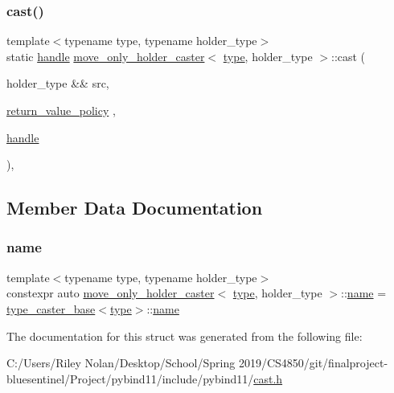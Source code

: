 \subsubsection{\texorpdfstring{cast()}{cast()}}
{\footnotesize\ttfamily template$<$typename type, typename holder\+\_\+type$>$ \\
static \mbox{\hyperlink{classhandle}{handle}} \mbox{\hyperlink{structmove__only__holder__caster}{move\+\_\+only\+\_\+holder\+\_\+caster}}$<$ \mbox{\hyperlink{_s_d_l__opengl_8h_ad5ddf6fca7b585646515660e810e0188}{type}}, holder\+\_\+type $>$\+::cast (\begin{DoxyParamCaption}\item[{holder\+\_\+type \&\&}]{src,  }\item[{\mbox{\hyperlink{detail_2common_8h_adde72ab1fb0dd4b48a5232c349a53841}{return\+\_\+value\+\_\+policy}}}]{,  }\item[{\mbox{\hyperlink{classhandle}{handle}}}]{ }\end{DoxyParamCaption})\hspace{0.3cm}{\ttfamily [inline]}, {\ttfamily [static]}}



\subsection{Member Data Documentation}
\mbox{\label{structmove__only__holder__caster_a6286ce9a51576874db390d75fde982d1}} 
\subsubsection{\texorpdfstring{name}{name}}
{\footnotesize\ttfamily template$<$typename type, typename holder\+\_\+type$>$ \\
constexpr auto \mbox{\hyperlink{structmove__only__holder__caster}{move\+\_\+only\+\_\+holder\+\_\+caster}}$<$ \mbox{\hyperlink{_s_d_l__opengl_8h_ad5ddf6fca7b585646515660e810e0188}{type}}, holder\+\_\+type $>$\+::\mbox{\hyperlink{structname}{name}} = \mbox{\hyperlink{classtype__caster__base}{type\+\_\+caster\+\_\+base}}$<$\mbox{\hyperlink{_s_d_l__opengl_8h_ad5ddf6fca7b585646515660e810e0188}{type}}$>$\+::\mbox{\hyperlink{structname}{name}}\hspace{0.3cm}{\ttfamily [static]}}



The documentation for this struct was generated from the following file\+:\begin{DoxyCompactItemize}
\item 
C\+:/\+Users/\+Riley Nolan/\+Desktop/\+School/\+Spring 2019/\+C\+S4850/git/finalproject-\/bluesentinel/\+Project/pybind11/include/pybind11/\mbox{\hyperlink{cast_8h}{cast.\+h}}\end{DoxyCompactItemize}
